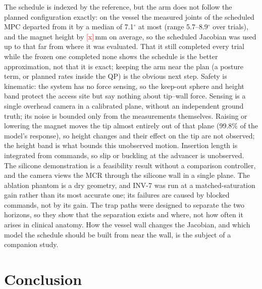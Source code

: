 \documentclass[journal]{IEEEtran}
\newcommand{\TBD}[1]{\textcolor{red}{[#1]}}
\begin{document}
The schedule is indexed by the reference, but the arm does not follow
the planned configuration exactly: on the vessel the measured joints of
the scheduled MPC departed from it by a median of 7.1$^\circ$ at most
(range 5.7--8.9$^\circ$ over trials), and the magnet height by
\TBD{x}\,mm on average, so the scheduled Jacobian was used up to that
far from where it was evaluated.
That it still completed every trial while
the frozen one completed none shows the schedule is the better
approximation, not that it is exact; keeping the arm near the plan
(a posture term, or planned rates inside the QP) is the obvious next
step. Safety is kinematic: the system has no force sensing, so the
keep-out sphere and height band protect the access site but say nothing
about tip--wall force. Sensing is a single overhead camera in a calibrated
plane, without an independent ground truth; its noise is bounded only
from the measurements themselves. Raising or lowering the magnet moves the
tip almost entirely out of that plane (99.8\% of the model's response), so
height changes and their effect on the tip are not observed; the height
band is what bounds this unobserved motion.
Insertion length is integrated from commands, so slip or buckling at the
advancer is unobserved. The silicone demonstration is a feasibility result without a comparison
controller, and the camera views the MCR through the silicone wall in a
single plane. %
The ablation phantom is a dry geometry, and INV-7 was run at a
matched-saturation gain rather than its most accurate one; its failures
are caused by blocked commands, not by its gain. The trap paths were
designed to separate the two horizons, so they show that the separation
exists and where, not how often it arises in clinical anatomy.
How the
vessel wall changes the Jacobian, and which model the schedule should be
built from near the wall, is the subject of a companion study.

\section{Conclusion}
\label{sec:conclusion}
\end{document}
